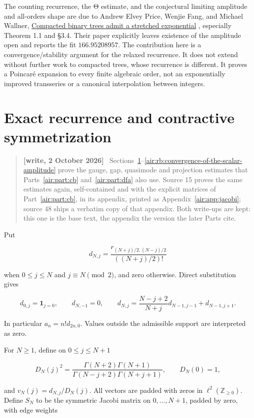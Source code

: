 \documentclass[11pt,letterpaper]{article}
\numberwithin{equation}{section}
\theoremstyle{remark}
\newenvironment{writenote}{\par\smallskip\begin{quote}\small\textbf{[write, 2 October 2026]}\ }{\end{quote}\smallskip}
\begin{document}
The counting recurrence, the Θ estimate, and the conjectural limiting amplitude and all-orders shape are due to Andrew Elvey Price, Wenjie Fang, and Michael Wallner, \href{https://arxiv.org/pdf/1908.11181}{Compacted binary trees admit a stretched exponential} \cite{epfw}, especially Theorem 1.1 and §3.4. Their paper explicitly leaves existence of the amplitude open and reports the fit \(166.95208957\). The contribution here is a convergence/stability argument for the relaxed recurrence. It does not extend without further work to compacted trees, whose recurrence is different. It proves a Poincaré expansion to every finite algebraic order, not an exponentially improved transseries or a canonical interpolation between integers.

\section{Exact recurrence and contractive symmetrization}\label{air:rb:exact-recurrence-and-contractive-symmetrization}
\begin{writenote}
Sections~\ref{air:rb:exact-recurrence-and-contractive-symmetrization}--\ref{air:rb:convergence-of-the-scalar-amplitude} prove the gauge, gap, quasimode and projection estimates that Parts~\ref{air:part:cb} and~\ref{air:part:dfa} also use. Source 15 proves the same estimates again, self-contained and with the explicit matrices of Part~\ref{air:part:cb}, in its appendix, printed as Appendix~\ref{air:app:jacobi}; source 48 ships a verbatim copy of that appendix. Both write-ups are kept: this one is the base text, the appendix the version the later Parts cite.
\end{writenote}


Put

\[
d_{N,j}=\frac{r_{(N+j)/2,(N-j)/2}}{((N+j)/2)!}
\]

when \(0\le j\le N\) and \(j\equiv N\pmod 2\), and zero otherwise. Direct substitution gives

\[
d_{0,j}=\mathbf 1_{j=0},\qquad d_{N,-1}=0,
\qquad
d_{N,j}=\frac{N-j+2}{N+j}d_{N-1,j-1}+d_{N-1,j+1}.
\tag{F4}
\]

In particular \(a_n=n!d_{2n,0}\). Values outside the admissible support are interpreted as zero.

For \(N\ge 1\), define on \(0\le j\le N+1\)

\[
D_N(j)^2=\frac{\Gamma(N+2)\Gamma(N+1)}
{\Gamma(N-j+2)\Gamma(N+j+1)},\qquad D_N(0)=1,
\]

and \(v_N(j)=d_{N,j}/D_N(j)\). All vectors are padded with zeros in \(\ell ^2(\mathbb Z_{\ge 0})\). Define \(S_N\) to be the symmetric Jacobi matrix on \(0,\ldots ,N+1\), padded by zero, with edge weights
\end{document}
